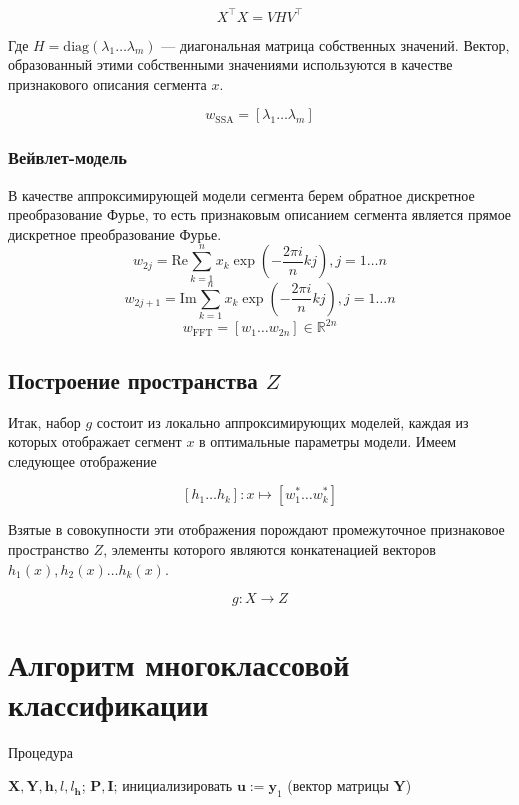 \documentclass[12pt,fleqn,unicode]{article}
\newcommand{\by}{\mathbf{y}}
\newcommand{\bY}{\mathbf{Y}}
\newcommand{\bX}{\mathbf{X}}
\newcommand{\bu}{\mathbf{u}}
\newcommand{\bh}{\mathbf{h}}
\newcommand{\bP}{\mathbf{P}}
\newcommand{\bI}{\mathbf{I}}
\newcommand{\R}{\mathbb{R}}
\newcommand{\brs}[1]{\left(#1\right)}
\newcommand{\sbrs}[1]{\left[#1\right]}
\begin{document}
$$
X^\intercal X = VHV^\intercal
$$

Где $H = \mathrm{diag}(\lambda_1\ldots \lambda_m)$ --- диагональная матрица собственных значений.
Вектор, образованный этими собственными значениями используются в качестве
признакового описания сегмента $x$.

$$
w_{\text{SSA}} = [\lambda_1 \ldots \lambda_m]
$$

\subsubsection{Вейвлет-модель}

В качестве аппроксимирующей модели сегмента берем обратное дискретное
преобразование Фурье,
то есть признаковым описанием сегмента является прямое дискретное преобразование
Фурье.
$$
    w_{2j} = \mathrm{Re} \sum_{k=1}^{n} x_k \exp\brs{-\frac{2\pi i}{n}kj}, j=1\ldots n
$$
$$
    w_{2j + 1} = \mathrm{Im} \sum_{k=1}^{n} x_k \exp\brs{-\frac{2\pi i}{n}kj}, j=1\ldots n
$$
$$
w_{\text{FFT}} = \sbrs{w_1\ldots w_{2n}}\in \R^{2n}
$$

\subsection{Построение пространства $Z$}


Итак, набор $g$ состоит из локально аппроксимирующих моделей, каждая из которых
отображает сегмент $x$ в оптимальные параметры модели. Имеем следующее отображение

$$
[h_1\ldots h_k]: x \mapsto [w_1^* \ldots w_k^*]
$$

Взятые в совокупности эти отображения порождают промежуточное признаковое пространство
$Z$, элементы которого являются конкатенацией векторов $h_1(x), h_2(x)\ldots h_k(x)$.

$$
g: X \to Z
$$

\section{Алгоритм многоклассовой классификации}


\begin{center}
\begin{algorithm}[h]
\caption{Процедура }
    \label{pseudo}
\begin{algorithmic}[1]
\REQUIRE $\bX, \bY, \bh, l, l_\bh$;
\ENSURE $\bP, \bI$;
\STATE инициализировать $\bu := \by_1$ (вектор матрицы $\bY$)

\ENDFOR
\end{algorithmic}
\end{algorithm}
\end{center}
\end{document}
